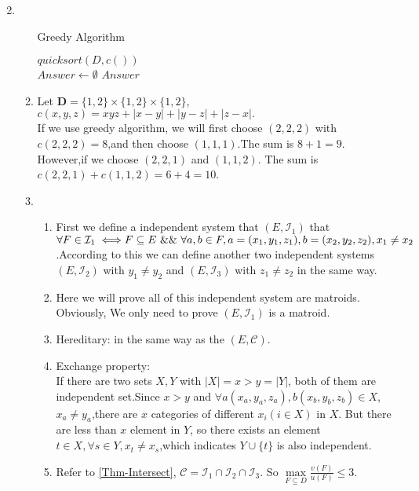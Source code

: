 \documentclass[12pt,a4paper]{article}
\makeatletter
\newtheorem*{solution}{Solution}
\theoremstyle{definition}
\renewenvironment{solution}[1][Solution] {\par\pushQED{\qed}\normalfont\topsep6\p@\@plus6\p@\relax\trivlist\item[\hskip\labelsep\bfseries#1\@addpunct{.}]\ignorespaces}{\popQED\endtrivlist\@endpefalse} \makeatother
\makeatother
\begin{document}
\begin{enumerate}
\begin{solution}
\begin{enumerate}
\begin{minipage}[t]{0.8\textwidth}
\begin{algorithm}[H]
        \BlankLine
        \caption{Greedy Algorithm}
        \label{algorithm 3}
        $quicksort(D,c())$\\
        $Answer\leftarrow \emptyset$\;
        \Return $Answer$\;
        \end{algorithm}
    	 \end{minipage}
    	 \item
    	 Let $\mathbf{D}=\{1,2\}\times\{1,2\}\times\{1,2\}$, $c(x,y,z)=xyz+|x-y|+|y-z|+|z-x|.$\\
    	 If we use greedy algorithm, we will first choose $(2,2,2)$ with $c(2,2,2)=8$,and then choose $(1,1,1)$.The sum is $8+1=9$.\\
    	 However,if we choose $(2,2,1)$ and $(1,1,2)$. The sum is $c(2,2,1)+c(1,1,2)=6+4=10$.
    	 \item 
    	 \begin{enumerate}
    	     \item First we define a independent system that $(E, \mathcal{I}_1)$ 
    	     that $\forall F\in \mathcal{I}_1 \iff \\F \subseteq E ~\&\&~ \forall a,b\in F,a=(x_1,y_1,z_1),b=(x_2,y_2,z_2),x_1\neq x_2$.According to this we can define another two independent systems $(E, \mathcal{I}_2)$ with $y_1\neq y_2$ and  $(E, \mathcal{I}_3)$ with $z_1\neq z_2$ in the same way.
    	     \item Here we will prove all of this independent system are matroids. Obviously, We only need to prove $(E, \mathcal{I}_1)$ is a matroid.
            \item Hereditary: in the same way as the $(E,\mathcal{C})$.  
            \item Exchange property:\\
            If there are two sets $X,Y$ with $|X|=x>y=|Y|$, both of them are independent set.Since $x>y$ and $\forall a(x_a,y_a,z_a),b(x_b,y_b,z_b) \in X$,$x_a\neq y_a$,there are $x$ categories of  different $x_i(i\in X)$ in $X$. But there are less than $x$ element in $Y$, so there exists an element $t\in X,\forall s\in Y,x_t\neq x_s$,which indicates $Y\cup \{t\}$ is also independent. 
            \item Refer to \ref{Thm-Intersect}, $\mathcal{C}=\mathcal{I}_1\cap \mathcal{I}_2\cap \mathcal{I}_3$. So $\max\limits_{F \subseteq D} \frac{v(F)}{u(F)} \leq 3$.
    	 \end{enumerate}

\end{enumerate}
\end{solution}
\end{enumerate}
\end{document}
